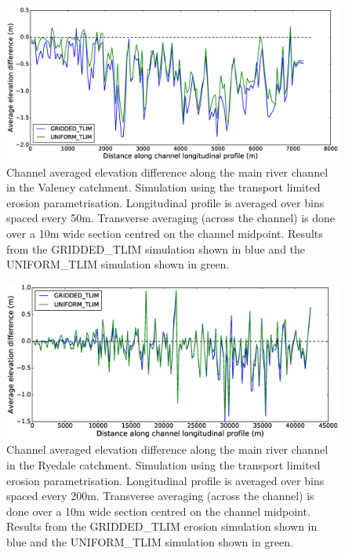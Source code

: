 \begin{figure}[htb]
\includegraphics[width=14cm]{chp06_figures_scripts/fig_swath_profile_boscastle_erode_tlim.eps}
\caption{Channel averaged elevation difference along the main river channel in the Valency catchment. Simulation using the transport limited erosion parametrisation. Longitudinal profile is averaged over bins spaced every 50m. Transverse averaging (across the channel) is done over a 10m wide section centred on the channel midpoint. Results from the GRIDDED\_TLIM simulation shown in blue and the UNIFORM\_TLIM simulation shown in green.}
\label{fig_boscastle_swath_tlim}
\end{figure}

\begin{figure}[htb]
\includegraphics[width=14cm]{chp06_figures_scripts/fig_swath_profile_ryedale_erode_tlim.eps}
\caption{Channel averaged elevation difference along the main river channel in the Ryedale catchment. Simulation using the transport limited erosion parametrisation. Longitudinal profile is averaged over bins spaced every 200m. Transverse averaging (across the channel) is done over a 10m wide section centred on the channel midpoint. Results from the GRIDDED\_TLIM erosion simulation shown in blue and the UNIFORM\_TLIM simulation shown in green.}
\label{fig_ryedale_swath_tlim}
\end{figure}

